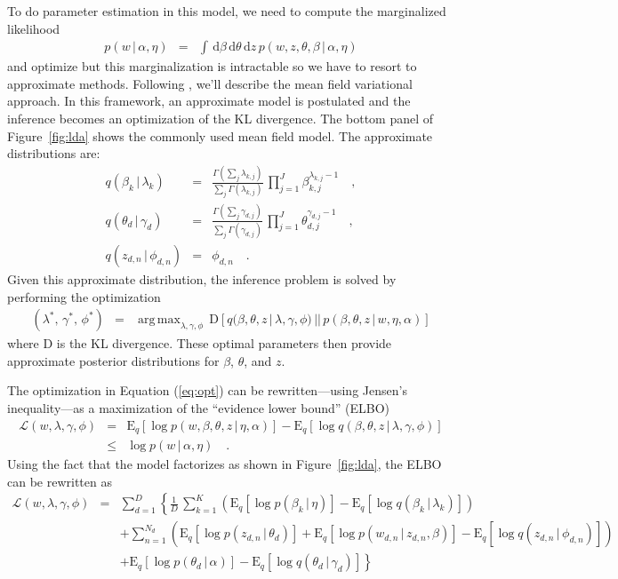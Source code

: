 \documentclass[11pt]{article}
\newcommand{\eq}[1]{Equation (\ref{eq:#1})}
\newcommand{\eqlabel}[1]{\label{eq:#1}}
\newcommand{\fig}[1]{Figure~\ref{fig:#1}}
\newcommand{\dd}{\ensuremath{\, \mathrm{d}}}
\newcommand{\expect}[2]{\ensuremath{\mathrm{E}_{#1}\left [ {#2} \right ]}}
\DeclareMathOperator*{\argmax}{arg\,max}
\begin{document}
To do parameter estimation in this model, we need to compute the marginalized
likelihood
\begin{eqnarray}
p(w\,|\,\alpha,\eta) &=& \int\dd\beta\dd\theta\dd z \,
    p(w,z,\theta,\beta\,|\,\alpha,\eta)
\end{eqnarray}
and optimize but this marginalization is intractable so we have to resort to
approximate methods.
Following \citet{lda}, we'll describe the mean field variational approach.
In this framework, an approximate model is postulated and the inference
becomes an optimization of the KL divergence.
The bottom panel of \fig{lda} shows the commonly used mean field model.
The approximate distributions are:
\begin{eqnarray}
q(\beta_k\,|\,\lambda_k) &=&
\frac{\Gamma\left( \sum_j \lambda_{k,j} \right)}{\sum_j \Gamma(\lambda_{k,j})}
\, \prod_{j=1}^J \beta_{k,j}^{\lambda_{k,j}-1} \quad, \\
q(\theta_d\,|\,\gamma_d) &=&
\frac{\Gamma\left( \sum_j \gamma_{d,j} \right)}{\sum_j \Gamma(\gamma_{d,j})}
\, \prod_{j=1}^J \theta_{d,j}^{\gamma_{d,j}-1} \quad, \\
q(z_{d,n}\,|\,\phi_{d,n}) &=& \phi_{d,n} \quad.
\end{eqnarray}
Given this approximate distribution, the inference problem is solved by
performing the optimization
\begin{eqnarray}\eqlabel{opt}
(\lambda^*,\,\gamma^*,\,\phi^*) &=& \argmax_{\lambda,\gamma,\phi}
\,\mathrm{D}\left [ q(\beta,\theta,z\,|\,\lambda,\gamma,\phi)\,||\,
p(\beta,\theta,z\,|\,w,\eta,\alpha)\right ]
\end{eqnarray}
where D is the KL divergence.
These optimal parameters then provide approximate posterior distributions for
$\beta$, $\theta$, and $z$.

The optimization in \eq{opt} can be rewritten---using Jensen's inequality---as
a maximization of the ``evidence lower bound'' (ELBO)
\begin{eqnarray}
\mathcal{L}(w,\lambda,\gamma,\phi) &=&
\expect{q}{\log p(w,\beta,\theta,z\,|\,\eta,\alpha)}
- \expect{q}{\log q(\beta,\theta,z\,|\,\lambda,\gamma,\phi)} \\
&\le& \log p(w\,|\,\alpha,\eta) \quad.
\end{eqnarray}
Using the fact that the model factorizes as shown in \fig{lda}, the ELBO can
be rewritten as
\begin{eqnarray}
\mathcal{L}(w,\lambda,\gamma,\phi) &=&
    \sum_{d=1}^D\left \{ \frac{1}{D}\,\sum_{k=1}^K \left (
    \expect{q}{\log p(\beta_k\,|\,\eta)}
    -\expect{q}{\log q(\beta_k\,|\,\lambda_k)} \right )\right.
\nonumber\\ &&
    +\sum_{n=1}^{N_d} \left ( \expect{q}{\log p(z_{d,n}\,|\,\theta_d)}
    +\expect{q}{\log p(w_{d,n}\,|\,z_{d,n},\beta)}
    -\expect{q}{\log q(z_{d,n}\,|\,\phi_{d,n})} \right)
\nonumber\\ &&  \left.
    +\expect{q}{\log p(\theta_d\,|\,\alpha)}
    -\expect{q}{\log q(\theta_d\,|\,\gamma_d)}
\right \}
\end{eqnarray}
\end{document}
